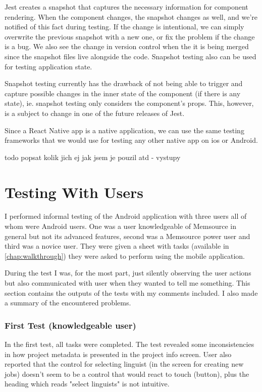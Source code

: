Jest creates a snapshot that captures the necessary information for component rendering. When the component changes, the snapshot changes as well, and we're notified of this fact during testing. If the change is intentional, we can simply overwrite the previous snapshot with a new one, or fix the problem if the change is a bug. We also see the change in version control when the it is being merged since the snapshot files live alongside the code. Snapshot testing also can be used for testing application state.

Snapshot testing currently has the drawback of not being able to trigger and capture possible changes in the inner state of the component (if there is any state), ie. snapshot testing only considers the component’s props. This, however, is a subject to change in one of the future releases of Jest.

Since a React Native app is a native application, we can use the same testing frameworks that we would use for testing any other native app on ios or Android. 

todo popsat kolik jich ej jak jsem je pouzil atd - vystupy


\section{Testing With Users}

I performed informal testing of the Android application with three users all of whom were Android users. One was a user knowledgeable of Memsource in general but not its advanced features, second was a Memsource power user and third was a novice user. They were given a sheet with tasks (available in \autoref{chap:walkthrough}) they were asked to perform using the mobile application.

During the test I was, for the most part, just silently observing the user actions but also communicated with user when they wanted to tell me something. This section contains the outputs of the tests with my comments included. I also made a summary of the encountered problems.


\subsubsection{First Test (knowledgeable user)}

In the first test, all tasks were completed. The test revealed some inconsistencies in how project metadata is presented in the project info screen. User also reported that the control for selecting linguist (in the screen for creating new jobs) doesn’t seem to be a control that would react to touch (button), plus the heading which reads "select linguists" is not intuitive. 

